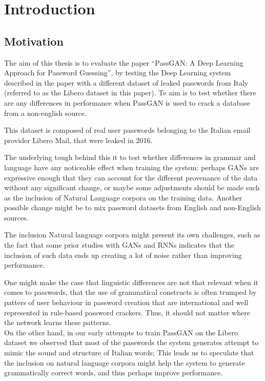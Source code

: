 \section{Introduction}\label{sec:introduction}
\subsection{Motivation}
The aim of this thesis is to evaluate the paper \enquote{PassGAN: A Deep Learning Approach for Password Guessing}\cite{PassGAN}, by testing the Deep Learning system described in the paper with a different dataset of leaked passwords from Italy\cite{libero_leak} (referred to as the Libero dataset in this paper). Te aim is to test whether there are any differences in performance when PassGAN is used to crack a database from a non-english source.

This dataset is composed of real user passwords belonging to the Italian email provider Libero Mail, that were leaked in 2016. %

The underlying tough behind this it to test whether differences in grammar and language have any noticeable effect when training the system: perhaps GANs are expressive enough that they 
can account for the different provenance of the data without any significant change, or maybe some adjustments should be made such as the inclusion of Natural Language corpora on the training data. Another possible change might be to mix password datasets from English and non-English sources.

The inclusion Natural language corpora might present its own challenges, such as the fact that some prior studies with GANs and RNNs indicates that the inclusion of such data ends up creating a lot of noise rather than improving performance\cite{Melicher2016}.

One might make the case that linguistic differences are not that relevant when it comes to passwords, that the use of grammatical constructs is often trumped by patters of user behaviour in password creation that are international and well represented in rule-based password crackers. Thus, it should not matter where the network learns these patterns.\\
On the other hand, in our early attempts to train PassGAN on the Libero dataset we observed that most of the passwords the system generates attempt to mimic the sound and structure of Italian words; This leads us to speculate that the inclusion on natural language corpora might help the system to generate grammatically correct words, and thus perhaps improve performance.

